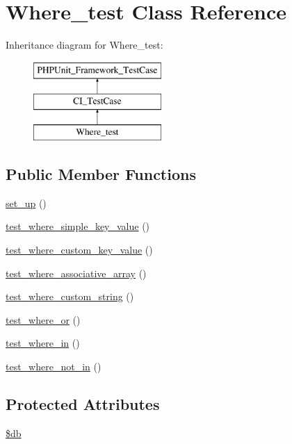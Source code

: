 \hypertarget{class_where__test}{}\section{Where\+\_\+test Class Reference}
\label{class_where__test}
Inheritance diagram for Where\+\_\+test\+:\begin{figure}[H]
\begin{center}
\leavevmode
\includegraphics[height=3.000000cm]{class_where__test}
\end{center}
\end{figure}
\subsection*{Public Member Functions}
\begin{DoxyCompactItemize}
\item 
\hyperlink{class_where__test_a69829875c8d4b6ce94908445c4155741}{set\+\_\+up} ()
\item 
\hyperlink{class_where__test_ad3f2e19b20400247b47475a9c98e50fa}{test\+\_\+where\+\_\+simple\+\_\+key\+\_\+value} ()
\item 
\hyperlink{class_where__test_a0fa80d7ebb4a2959145024f6ea2a5cac}{test\+\_\+where\+\_\+custom\+\_\+key\+\_\+value} ()
\item 
\hyperlink{class_where__test_aa0c82767b9c2d0b4afd80051a95481ed}{test\+\_\+where\+\_\+associative\+\_\+array} ()
\item 
\hyperlink{class_where__test_ae71237bf2496c6a486b305fc3d4b8e07}{test\+\_\+where\+\_\+custom\+\_\+string} ()
\item 
\hyperlink{class_where__test_ad211885f96f8373213e70b0ecfa2b646}{test\+\_\+where\+\_\+or} ()
\item 
\hyperlink{class_where__test_a7c1300557c23d176d698ca71eb3ad83b}{test\+\_\+where\+\_\+in} ()
\item 
\hyperlink{class_where__test_a3c5e2b6ce0727c976d70a397003c101e}{test\+\_\+where\+\_\+not\+\_\+in} ()
\end{DoxyCompactItemize}
\subsection*{Protected Attributes}
\begin{DoxyCompactItemize}
\item 
\hyperlink{class_where__test_a1fa3127fc82f96b1436d871ef02be319}{\$db}
\end{DoxyCompactItemize}
